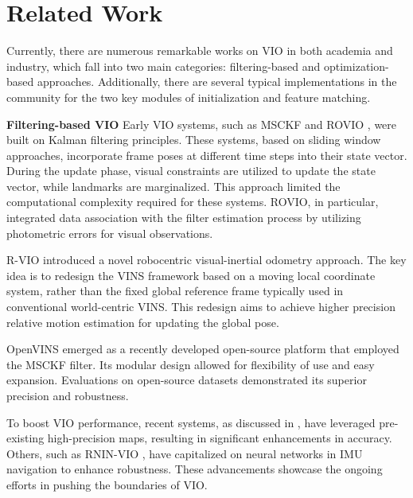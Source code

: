 \section{Related Work}

Currently, there are numerous remarkable works on VIO in both academia and industry, which fall into two main categories: filtering-based and optimization-based approaches. Additionally, there are several typical implementations in the community for the two key modules of initialization and feature matching.

 \textbf{Filtering-based VIO} Early VIO systems, such as MSCKF \cite{mourikis-icra-2007} and ROVIO \cite{bloesch-ijrr-2017}, were built on Kalman filtering principles. These systems, based on sliding window approaches, incorporate frame poses at different time steps into their state vector.  During the update phase, visual constraints are utilized to update the state vector, while landmarks are marginalized. This approach limited the computational complexity required for these systems. ROVIO, in particular, integrated data association with the filter estimation process by utilizing photometric errors for visual observations. 
 
R-VIO \cite{huai2022robocentric} introduced a novel robocentric visual-inertial odometry approach. The key idea is to redesign the VINS framework based on a moving local coordinate system, rather than the fixed global reference frame typically used in conventional world-centric VINS. This redesign aims to achieve higher precision relative motion estimation for updating the global pose. 

OpenVINS \cite{geneva2020openvins} emerged as a recently developed open-source platform that employed the MSCKF filter. Its modular design allowed for flexibility of use and easy expansion. Evaluations on open-source datasets demonstrated its superior precision and robustness.

To boost VIO performance, recent systems, as discussed in \cite{bao2022robust}, have leveraged pre-existing high-precision maps, resulting in significant enhancements in accuracy. Others, such as RNIN-VIO \cite{chen2021rnin}, have capitalized on neural networks in IMU navigation to enhance robustness. These advancements showcase the ongoing efforts in pushing the boundaries of VIO.


